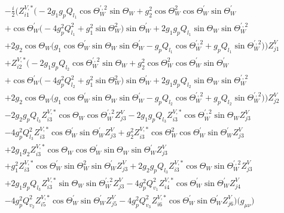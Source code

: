 \begin{align} 
 &-\frac{i}{2} \Big(Z^{V,*}_{i 1} \Big(-2 g_1 g_p Q_{l_1} \cos\Theta_{W}^{\prime,2} \sin\Theta_W  +g_{2}^{2} \cos\Theta_{W }^{2} \cos\Theta_W^{\prime}  \sin\Theta_W^{\prime}  \nonumber \\ 
 &+\cos\Theta_W^{\prime}  \Big(-4 g_{p}^{2} Q_{l_1}^{2}  + g_{1}^{2} \sin\Theta_{W }^{2} \Big)\sin\Theta_W^{\prime}  +2 g_1 g_p Q_{l_1} \sin\Theta_W  \sin\Theta_{W}^{\prime,2} \nonumber \\ 
 &+2 g_2 \cos\Theta_W  \Big(g_1 \cos\Theta_W^{\prime}  \sin\Theta_W  \sin\Theta_W^{\prime}   - g_p Q_{l_1} \cos\Theta_{W}^{\prime,2}  + g_p Q_{l_1} \sin\Theta_{W}^{\prime,2} \Big)\Big)Z_{{j 1}}^{V} \nonumber \\ 
 &+Z^{V,*}_{i 2} \Big(-2 g_1 g_p Q_{l_2} \cos\Theta_{W}^{\prime,2} \sin\Theta_W  +g_{2}^{2} \cos\Theta_{W }^{2} \cos\Theta_W^{\prime}  \sin\Theta_W^{\prime}  \nonumber \\ 
 &+\cos\Theta_W^{\prime}  \Big(-4 g_{p}^{2} Q_{l_2}^{2}  + g_{1}^{2} \sin\Theta_{W }^{2} \Big)\sin\Theta_W^{\prime}  +2 g_1 g_p Q_{l_2} \sin\Theta_W  \sin\Theta_{W}^{\prime,2} \nonumber \\ 
 &+2 g_2 \cos\Theta_W  \Big(g_1 \cos\Theta_W^{\prime}  \sin\Theta_W  \sin\Theta_W^{\prime}   - g_p Q_{l_2} \cos\Theta_{W}^{\prime,2}  + g_p Q_{l_2} \sin\Theta_{W}^{\prime,2} \Big)\Big)Z_{{j 2}}^{V} \nonumber \\ 
 &-2 g_2 g_p Q_{l_3} Z^{V,*}_{i 3} \cos\Theta_W  \cos\Theta_{W}^{\prime,2} Z_{{j 3}}^{V} -2 g_1 g_p Q_{l_3} Z^{V,*}_{i 3} \cos\Theta_{W}^{\prime,2} \sin\Theta_W  Z_{{j 3}}^{V} \nonumber \\ 
 &-4 g_{p}^{2} Q_{l_3}^{2} Z^{V,*}_{i 3} \cos\Theta_W^{\prime}  \sin\Theta_W^{\prime}  Z_{{j 3}}^{V} +g_{2}^{2} Z^{V,*}_{i 3} \cos\Theta_{W }^{2} \cos\Theta_W^{\prime}  \sin\Theta_W^{\prime}  Z_{{j 3}}^{V} \nonumber \\ 
 &+2 g_1 g_2 Z^{V,*}_{i 3} \cos\Theta_W  \cos\Theta_W^{\prime}  \sin\Theta_W  \sin\Theta_W^{\prime}  Z_{{j 3}}^{V} \nonumber \\ 
 &+g_{1}^{2} Z^{V,*}_{i 3} \cos\Theta_W^{\prime}  \sin\Theta_{W }^{2} \sin\Theta_W^{\prime}  Z_{{j 3}}^{V} +2 g_2 g_p Q_{l_3} Z^{V,*}_{i 3} \cos\Theta_W  \sin\Theta_{W}^{\prime,2} Z_{{j 3}}^{V} \nonumber \\ 
 &+2 g_1 g_p Q_{l_3} Z^{V,*}_{i 3} \sin\Theta_W  \sin\Theta_{W}^{\prime,2} Z_{{j 3}}^{V} -4 g_{p}^{2} Q_{v_1}^{2} Z^{V,*}_{i 4} \cos\Theta_W^{\prime}  \sin\Theta_W^{\prime}  Z_{{j 4}}^{V} \nonumber \\ 
 &-4 g_{p}^{2} Q_{v_2}^{2} Z^{V,*}_{i 5} \cos\Theta_W^{\prime}  \sin\Theta_W^{\prime}  Z_{{j 5}}^{V} -4 g_{p}^{2} Q_{v_3}^{2} Z^{V,*}_{i 6} \cos\Theta_W^{\prime}  \sin\Theta_W^{\prime}  Z_{{j 6}}^{V} \Big)\Big(g_{\mu \nu}\Big)\end{align} 
